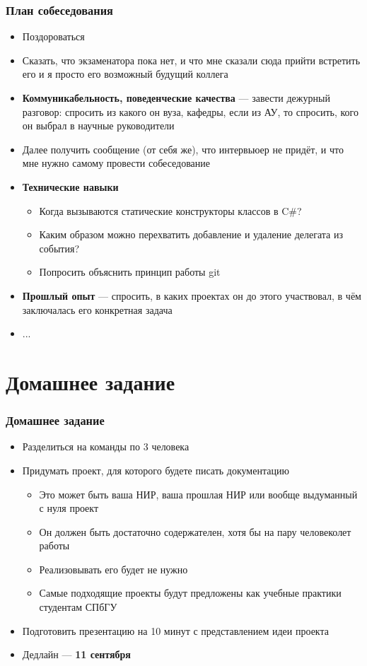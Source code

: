 \documentclass[xetex,mathserif,serif]{beamer}
\begin{document}
	\begin{frame}
		\frametitle{План собеседования}
		\begin{small}
			\begin{itemize}
				\item Поздороваться
				\item Сказать, что экзаменатора пока нет, и что мне сказали сюда прийти встретить его и я просто его возможный будущий коллега
				\item \textbf{Коммуникабельность, поведенческие качества} --- завести дежурный разговор: спросить из какого он вуза, кафедры, если из АУ, то спросить, кого он выбрал в научные руководители
				\item Далее получить сообщение (от себя же), что интервьюер не придёт, и что мне нужно самому провести собеседование
				\item \textbf{Технические навыки}
				\begin{itemize}
					\item ​Когда вызываются статические конструкторы классов в C\#?
					\item Каким образом можно перехватить добавление и удаление делегата из события?
					\item Попросить объяснить принцип работы git
				\end{itemize}
				\item \textbf{Прошлый опыт} --- спросить, в каких проектах он до этого участвовал, в чём заключалась его конкретная задача
				\item ...
			\end{itemize}
		\end{small}
	\end{frame}

	\section{Домашнее задание}

	\begin{frame}
		\frametitle{Домашнее задание}
		\begin{itemize}
			\item Разделиться на команды по 3 человека
			\item Придумать проект, для которого будете писать документацию
			\begin{itemize}
				\item Это может быть ваша НИР, ваша прошлая НИР или вообще выдуманный с нуля проект
				\item Он должен быть достаточно содержателен, хотя бы на пару человеколет работы
				\item Реализовывать его будет не нужно
				\item Самые подходящие проекты будут предложены как учебные практики студентам СПбГУ
			\end{itemize}
			\item Подготовить презентацию на 10 минут с представлением идеи проекта
			\item Дедлайн --- \textbf{11 сентября}
		\end{itemize}
	\end{frame}
\end{document}

